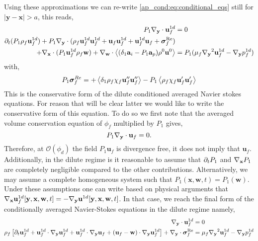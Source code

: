 Using these approximations we can re-write \ref{ap_cond:eq:conditional_eqs} still for $|\textbf{y}-\textbf{x}| > a$, this reads,  
\begin{align}
    P_1 {\mathbf{\nabla}_\textbf{y}} \cdot \textbf{u}^{1d}_f &= 0 \\
    \partial_t (P_1 \rho_f \textbf{u}_f^{1d})
    + P_1 {\mathbf{\nabla}_\textbf{y}}\cdot (
    \rho_f \textbf{u}^{1d}_f\textbf{u}_f^{1d} 
    + \textbf{u}_f\textbf{u}_f^{1d}
    + \textbf{u}^{1d}_f\textbf{u}_f
    + \bm\sigma^\text{Re}_f)\nonumber\\
    + {\mathbf{\nabla}_\textbf{x}}\cdot (P_1 \textbf{u}_f^{1d}\rho_f\textbf{w}) 
    + {\mathbf{\nabla}_\textbf{w}}\cdot \left<(\delta_1 \textbf{a}_i- P_1 \textbf{a}_p)\rho^0\textbf{u}^0 \right>
    &= P_1 (
        \mu_f {\mathbf{\nabla}_\textbf{y}}^2 \textbf{u}^{1d}_f  
        - {\mathbf{\nabla}_\textbf{y}} p_f^{1d} 
    )
\end{align}
with, 
\begin{equation*}
    P_1\bm\sigma^{Re}_f
    = 
    + \left<\delta_1\rho_f\chi_f\textbf{u}_f''\textbf{u}_f''\right>
    - P_1 \left<\rho_f\chi_f\textbf{u}_f'\textbf{u}_f'\right>
\end{equation*}
This is the conservative form of the dilute conditioned averaged Navier stokes equations. 
For reason that will be clear latter we would like to write the conservative form of this equation.
To do so we first note that the averaged volume conservation equation of $\phi_f$ multiplied by $P_1$ gives, 
\begin{equation*}
    P_1{\mathbf{\nabla}_\textbf{y}} \cdot \textbf{u}_f = 0.
\end{equation*}
Therefore, at $\mathcal{O}(\phi_d)$ the field $P_1\textbf{u}_f$ is divergence free, it does not imply that $\textbf{u}_f$. 
Additionally, in the dilute regime is it reasonable to assume that $\partial_t P_1$ and ${\mathbf{\nabla}_\textbf{x}} P_1$ are completely negligible compared to the other contributions. 
Alternatively, we may assume a complete homogeneous system such that $P_1(\textbf{x},\textbf{w},t) = P_1(\textbf{w})$. 
Under these assumptions one can write based on physical arguments that ${\mathbf{\nabla}_\textbf{x}} \textbf{u}_f^{1d}[\textbf{y},\textbf{x},\textbf{w},t] = - {\mathbf{\nabla}_\textbf{y}} \textbf{u}^{1d}[\textbf{y},\textbf{x},\textbf{w},t]$.
In that case, we reach the final form of the conditionally averaged Navier-Stokes equations in the dilute regime  namely, 
\begin{align}
    \pddy \cdot \textbf{u}^{1d}_f &= 0 \\
    \rho_f \left[
        \pddt \textbf{u}_f^{1d}
        +  \textbf{u}^{1d}_f\cdot \pddy\textbf{u}_f^{1d} 
        +  \textbf{u}^{1d}_f\cdot \pddy\textbf{u}_f 
        +  (\textbf{u}_f - \textbf{w})\cdot \pddy\textbf{u}_f^{1d}
    \right]
    + \pddy \cdot \bm\sigma^\text{Re}_f
    &=
        \mu_f \pddy^2 \textbf{u}^{1d}_f  
        - \pddy p_f^{1d} 
    \label{eq:conditional_avg_eq_final}
\end{align}
